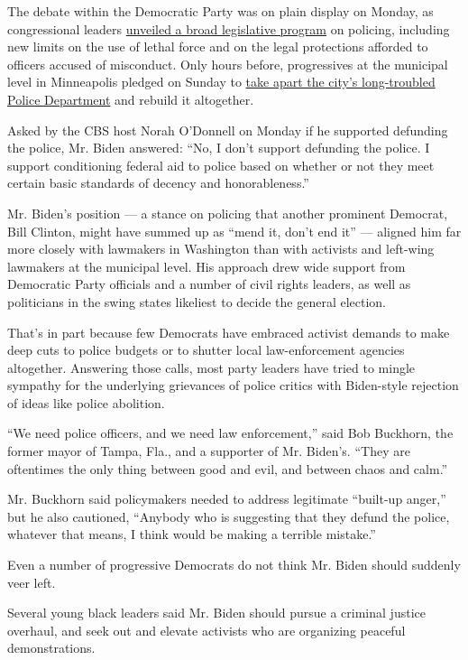 The debate within the Democratic Party was on plain display on Monday,
as congressional leaders
\href{https://www.nytimes3xbfgragh.onion/2020/06/08/us/politics/democrats-police-misconduct-bill-protests.html}{unveiled
a broad legislative program} on policing, including new limits on the
use of lethal force and on the legal protections afforded to officers
accused of misconduct. Only hours before, progressives at the municipal
level in Minneapolis pledged on Sunday to
\href{https://www.nytimes3xbfgragh.onion/2020/06/07/us/minneapolis-police-abolish.html}{take
apart the city's long-troubled Police Department} and rebuild it
altogether.

Asked by the CBS host Norah O'Donnell on Monday if he supported
defunding the police, Mr. Biden answered: ``No, I don't support
defunding the police. I support conditioning federal aid to police based
on whether or not they meet certain basic standards of decency and
honorableness.''

Mr. Biden's position --- a stance on policing that another prominent
Democrat, Bill Clinton, might have summed up as ``mend it, don't end
it'' --- aligned him far more closely with lawmakers in Washington than
with activists and left-wing lawmakers at the municipal level. His
approach drew wide support from Democratic Party officials and a number
of civil rights leaders, as well as politicians in the swing states
likeliest to decide the general election.

That's in part because few Democrats have embraced activist demands to
make deep cuts to police budgets or to shutter local law-enforcement
agencies altogether. Answering those calls, most party leaders have
tried to mingle sympathy for the underlying grievances of police critics
with Biden-style rejection of ideas like police abolition.

``We need police officers, and we need law enforcement,'' said Bob
Buckhorn, the former mayor of Tampa, Fla., and a supporter of Mr.
Biden's. ``They are oftentimes the only thing between good and evil, and
between chaos and calm.''

Mr. Buckhorn said policymakers needed to address legitimate ``built-up
anger,'' but he also cautioned, ``Anybody who is suggesting that they
defund the police, whatever that means, I think would be making a
terrible mistake.''

Even a number of progressive Democrats do not think Mr. Biden should
suddenly veer left.

Several young black leaders said Mr. Biden should pursue a criminal
justice overhaul, and seek out and elevate activists who are organizing
peaceful demonstrations.

